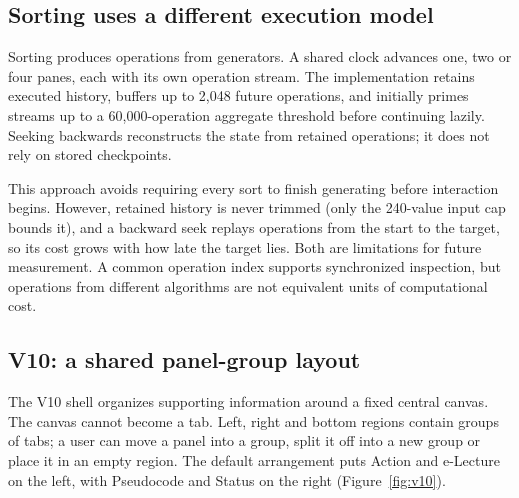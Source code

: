 \documentclass[11pt,a4paper]{article}
\newcommand{\page}{\par\Needspace{5\baselineskip}\vspace{6pt}}
\begin{document}
\subsection{Sorting uses a different execution model}
Sorting produces operations from generators. A shared clock advances one, two or four panes, each with its own operation stream. The implementation retains executed history, buffers up to 2,048 future operations, and initially primes streams up to a 60,000-operation aggregate threshold before continuing lazily. Seeking backwards reconstructs the state from retained operations; it does not rely on stored checkpoints.

This approach avoids requiring every sort to finish generating before interaction begins. However, retained history is never trimmed (only the 240-value input cap bounds it), and a backward seek replays operations from the start to the target, so its cost grows with how late the target lies. Both are limitations for future measurement. A common operation index supports synchronized inspection, but operations from different algorithms are not equivalent units of computational cost.

\page
\subsection{V10: a shared panel-group layout}\label{sec:v10}
The V10 shell organizes supporting information around a fixed central canvas. The canvas cannot become a tab. Left, right and bottom regions contain groups of tabs; a user can move a panel into a group, split it off into a new group or place it in an empty region. The default arrangement puts Action and e-Lecture on the left, with Pseudocode and Status on the right (Figure~\ref{fig:v10}).
\end{document}

